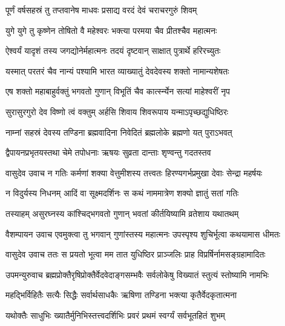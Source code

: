 \twolineshloka
{पूर्णं वर्षसहस्रं तु तप्तवानेष माधवः}%
{प्रसाद्य वरदं देवं चराचरगुरुं शिवम्}%

\twolineshloka
{युगे युगे तु कृष्णेन तोषितो वै महेश्वरः}%
{भक्त्या परमया चैव प्रीतश्चैव महात्मनः}%

\twolineshloka
{ऐश्वर्यं यादृशं तस्य जगद्योनेर्महात्मनः}%
{तदयं दृष्टवान् साक्षात् पुत्रार्थे हरिरच्युतः}%

\twolineshloka
{यस्मात् परतरं चैव नान्यं पश्यामि भारत}%
{व्याख्यातुं देवदेवस्य शक्तो नामान्यशेषतः}%

\twolineshloka
{एष शक्तो महाबाहुर्वक्तुं भगवतो गुणान्}%
{विभूतिं चैव कार्त्स्न्येन सत्यां माहेश्वरीं नृप}%

\twolineshloka
{सुरासुरगुरो देव विष्णो त्वं वक्तुम् अर्हसि}%
{शिवाय शिवरूपाय यन्माऽपृच्छद्युधिष्ठिरः}%

\twolineshloka
{नाम्नां सहस्रं देवस्य तण्डिना ब्रह्मवादिना}%
{निवेदितं ब्रह्मलोके ब्रह्मणो यत् पुराऽभवत्}%

\twolineshloka
{द्वैपायनप्रभृतयस्तथा चेमे तपोधनाः}%
{ऋषयः सुव्रता दान्ताः शृण्वन्तु गदतस्तव}%


वासुदेव उवाच\nopagebreak[4]
\twolineshloka
{न गतिः कर्मणां शक्या वेत्तुमीशस्य तत्त्वतः}%
{हिरण्यगर्भप्रमुखा देवाः सेन्द्रा महर्षयः}%

\twolineshloka
{न विदुर्यस्य निधनम् आदिं वा सूक्ष्मदर्शिनः}%
{स कथं नाममात्रेण शक्यो ज्ञातुं सतां गतिः}%

\twolineshloka
{तस्याहम् असुरघ्नस्य कांश्चिद्भगवतो गुणान्}%
{भवतां कीर्तयिष्यामि व्रतेशाय यथातथम्}%

वैशम्पायन उवाच\nopagebreak[4]
\twolineshloka
{एवमुक्त्वा तु भगवान् गुणांस्तस्य महात्मनः}%
{उपस्पृश्य शुचिर्भूत्वा कथयामास धीमतः}%

वासुदेव उवाच\nopagebreak[4]
\twolineshloka
{ततः स प्रयतो भूत्वा मम तात युधिष्ठिर}%
{प्राञ्जलिः प्राह विप्रर्षिर्नामसङ्ग्रहामादितः}%


उपमन्युरुवाच\nopagebreak[4]
\twolineshloka
{ब्रह्मप्रोक्तैरृषिप्रोक्तैर्वेदवेदाङ्गसम्भवैः}%
{सर्वलोकेषु विख्यातं स्तुत्यं स्तोष्यामि नामभिः}%

\twolineshloka
{महद्भिर्विहितैः सत्यैः सिद्धैः सर्वार्थसाधकैः}%
{ऋषिणा तण्डिना भक्त्या कृतैर्वेदकृतात्मना}%

\twolineshloka
{यथोक्तैः साधुभिः ख्यातैर्मुनिभिस्तत्त्वदर्शिभिः}%
{प्रवरं प्रथमं स्वर्ग्यं सर्वभूतहितं शुभम्}%

